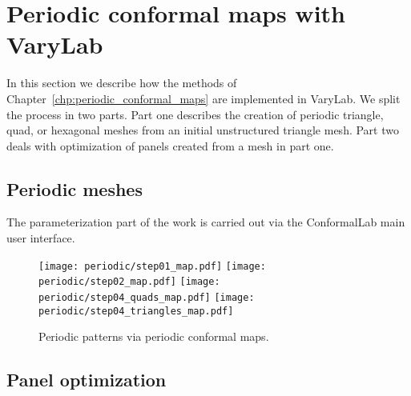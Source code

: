 \documentclass[Thesis.tex]{subfiles}
\begin{document}
\section{Periodic conformal maps with {\sc VaryLab}}
In this section we describe how the methods of Chapter~\ref{chp:periodic_conformal_maps} are implemented in {\sc VaryLab}. We split the process in two parts. Part one describes the creation of periodic triangle, quad, or hexagonal meshes from an initial unstructured triangle mesh. Part two deals with optimization of panels created from a mesh in part one.

\subsection{Periodic meshes}
The parameterization part of the work is carried out via the {\sc ConformalLab} main user interface. 

\begin{figure}
\texttt{[image: periodic/step01\_map.pdf]}
\texttt{[image: periodic/step02\_map.pdf]}	
\texttt{[image: periodic/step04\_quads\_map.pdf]}
\texttt{[image: periodic/step04\_triangles\_map.pdf]}	
\caption{Periodic patterns via periodic conformal maps.}
\label{fig:periodic_algorithm}
\end{figure}

\subsection{Panel optimization}
\end{document}
